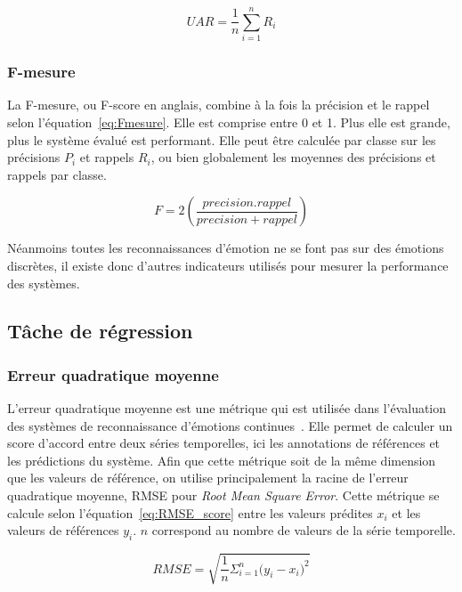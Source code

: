 \begin{equation}
  UAR = \dfrac{1}{n} \sum_{i=1}^n R_i
  \label{eq:UAR}
\end{equation}

\subsubsection{F-mesure}

La F-mesure, ou F-score en anglais, combine à la fois la précision et le rappel selon l'équation~\ref{eq:Fmesure}. Elle est comprise entre 0 et 1. Plus elle est grande, plus le système évalué est performant. Elle peut être calculée par classe sur les précisions $P_i$ et rappels $R_i$, ou bien globalement les moyennes des précisions et rappels par classe.

\begin{equation}
  F = 2 \left( \frac{precision.rappel}{precision+rappel} \right)
  \label{eq:Fmesure}
\end{equation}

Néanmoins toutes les reconnaissances d'émotion ne se font pas sur des émotions discrètes, il existe donc d'autres indicateurs utilisés pour mesurer la performance des systèmes.

\subsection{Tâche de régression}

\subsubsection{Erreur quadratique moyenne}
L'erreur quadratique moyenne est une métrique qui est utilisée dans l'évaluation des systèmes de reconnaissance d'émotions continues~\cite{AVEC2017}. Elle permet de calculer un score d'accord entre deux séries temporelles, ici les annotations de références et les prédictions du système. Afin que cette métrique soit de la même dimension que les valeurs de référence, on utilise principalement la racine de l'erreur quadratique moyenne, RMSE pour \textit{Root Mean Square Error}. Cette métrique se calcule selon l'équation~\ref{eq:RMSE_score} entre les valeurs prédites $x_i$  et les valeurs de références $y_i$. $n$ correspond au nombre de valeurs de la série temporelle.

\begin{equation}
    RMSE = \sqrt{\frac{1}{n}\Sigma_{i=1}^{n}{\Big(y_i - x_i\Big)^2}}
\label{eq:RMSE_score}
\end{equation}

